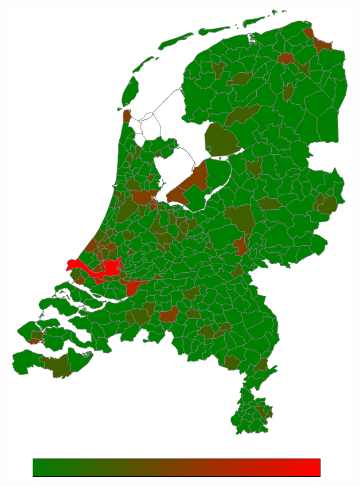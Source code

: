 \documentclass[a4paper,twoside,11pt]{article}
\begin{document}
\begin{figure}[h]
\begin{subfigure}[b]{0.118\textwidth}
                \includegraphics[width=\textwidth]{Heatmaps/HeatMap9.png}
                \caption{}
                \label{fig:Antilles}
        \end{subfigure}%
        \begin{subfigure}[b]{0.118\textwidth}

\end{subfigure}
\end{figure}
\end{document}
